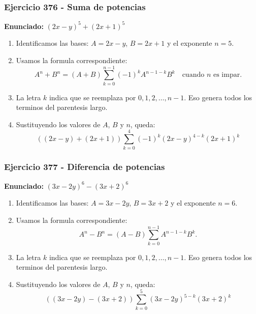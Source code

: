 \documentclass[11pt,a4paper]{article}
\begin{document}
\subsubsection*{Ejercicio 376 - Suma de potencias}
\textbf{Enunciado:} $ \left(2 x - y\right)^{5}+\left(2 x + 1\right)^{5} $\par
\begin{enumerate}[leftmargin=2em]
\item Identificamos las bases: \(A=2 x - y\), \(B=2 x + 1\) y el exponente \(n=5\).
\item Usamos la formula correspondiente: \[A^n+B^n=(A+B)\sum_{k=0}^{n-1}(-1)^kA^{n-1-k}B^k\quad\text{cuando }n\text{ es impar}.\]
\item La letra \(k\) indica que se reemplaza por \(0,1,2,\ldots,n-1\). Eso genera todos los terminos del parentesis largo.
\item Sustituyendo los valores de \(A\), \(B\) y \(n\), queda: \[\boxed{\left(\left(2 x - y\right)+\left(2 x + 1\right)\right)\sum_{k=0}^{4}(-1)^k\left(2 x - y\right)^{4-k}\left(2 x + 1\right)^k}\]
\end{enumerate}

\vspace{0.2cm}
\subsubsection*{Ejercicio 377 - Diferencia de potencias}
\textbf{Enunciado:} $ \left(3 x - 2 y\right)^{6}-\left(3 x + 2\right)^{6} $\par
\begin{enumerate}[leftmargin=2em]
\item Identificamos las bases: \(A=3 x - 2 y\), \(B=3 x + 2\) y el exponente \(n=6\).
\item Usamos la formula correspondiente: \[A^n-B^n=(A-B)\sum_{k=0}^{n-1}A^{n-1-k}B^k.\]
\item La letra \(k\) indica que se reemplaza por \(0,1,2,\ldots,n-1\). Eso genera todos los terminos del parentesis largo.
\item Sustituyendo los valores de \(A\), \(B\) y \(n\), queda: \[\boxed{\left(\left(3 x - 2 y\right)-\left(3 x + 2\right)\right)\sum_{k=0}^{5}\left(3 x - 2 y\right)^{5-k}\left(3 x + 2\right)^k}\]
\end{enumerate}

\vspace{0.2cm}
\end{document}
